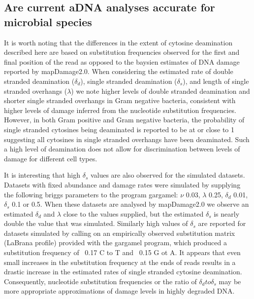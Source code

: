 \documentclass[12pt, a4paper]{article}
\begin{document}
\subsection{Are current aDNA analyses accurate for microbial species}

It is worth noting that the differences in the extent of cytosine deamination described here are based on substitution frequencies observed for the first and final position of the read as opposed to the baysien estimates of DNA damage reported by mapDamage2.0. 
When considering the estimated rate of double stranded deamination ($ \delta_{d} $), single stranded deamination ($ \delta_{s}$), and length of single stranded overhangs ($\lambda$) we note higher levels of double stranded deamination and shorter single stranded overhangs in Gram negative bacteria, consistent with higher levels of damage inferred from the nucleotide substitution frequencies. 
However, in both Gram positive and Gram negative bacteria, the probability of single stranded cytosines being deaminated is reported to be at or close to 1 suggesting all cytosines in single stranded overhangs have been deaminated.
Such a high level of deamination does not allow for discrimination between levels of damage for different cell types.

It is interesting that high $\delta_{s}$ values are also observed for the simulated datasets.
Datasets with fixed abundance and damage rates were simulated by supplying the following briggs parameters to the program gargamel:
$\nu$ 0.03, $\lambda$ 0.25, $\delta_{d}$ 0.01, $\delta_{s}$ 0.1 or 0.5.
When these datasets are analysed by mapDamage2.0 we observe an estimated $\delta_{d}$ and $\lambda$ close to the values supplied, but the estimated $\delta_{s}$ is nearly double the value that was simulated. 
Similarly high values of $\delta_{s}$ are reported for datasets simulated by calling on an empirically observed substitution matrix (LaBrana profile) provided with the gargamel program, which produced a substitution frequency of ~0.17 C to T and ~0.15 G ot A. 
It appears that even small increases in the substitution frequency at the ends of reads results in a drastic increase in the estimated rates of single stranded cytosine deamination. 
Consequently, nucleotide substitution frequencies or the ratio of $\delta_{d} to \delta_{s}  $ may be more appropriate approximations of damage levels in highly degraded DNA.
\end{document}
